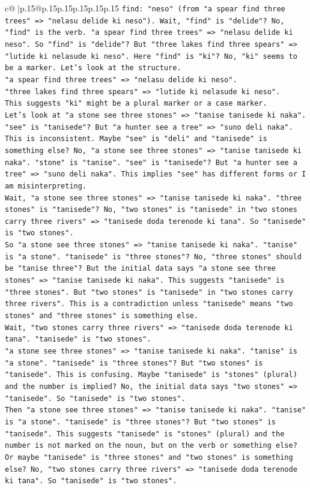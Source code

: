 \documentclass{article}
\begin{document}
{\begin{supertabular}{c@{$\;$}|p{.15\linewidth}@{}p{.15\linewidth}p{.15\linewidth}p{.15\linewidth}p{.15\linewidth}p{.15\linewidth}}
{{{\texttt{find: "neso" (from "a spear find three trees" => "nelasu delide ki neso"). Wait, "find" is "delide"? No, "find" is the verb. "a spear find three trees" => "nelasu delide ki neso". So "find" is "delide"? But "three lakes find three spears" => "lutide ki nelasude ki neso". Here "find" is "ki"? No, "ki" seems to be a marker. Let's look at the structure.} \\
\texttt{"a spear find three trees" => "nelasu delide ki neso".} \\
\texttt{"three lakes find three spears" => "lutide ki nelasude ki neso".} \\
\texttt{This suggests "ki" might be a plural marker or a case marker.} \\
\texttt{Let's look at "a stone see three stones" => "tanise tanisede ki naka". "see" is "tanisede"? But "a hunter see a tree" => "suno deli naka". This is inconsistent. Maybe "see" is "deli" and "tanisede" is something else? No, "a stone see three stones" => "tanise tanisede ki naka". "stone" is "tanise". "see" is "tanisede"? But "a hunter see a tree" => "suno deli naka". This implies "see" has different forms or I am misinterpreting.} \\
\texttt{Wait, "a stone see three stones" => "tanise tanisede ki naka". "three stones" is "tanisede"? No, "two stones" is "tanisede" in "two stones carry three rivers" => "tanisede doda terenode ki tana". So "tanisede" is "two stones".} \\
\texttt{So "a stone see three stones" => "tanise tanisede ki naka". "tanise" is "a stone". "tanisede" is "three stones"? No, "three stones" should be "tanise three"? But the initial data says "a stone see three stones" => "tanise tanisede ki naka". This suggests "tanisede" is "three stones". But "two stones" is "tanisede" in "two stones carry three rivers". This is a contradiction unless "tanisede" means "two stones" and "three stones" is something else.} \\
\texttt{Wait, "two stones carry three rivers" => "tanisede doda terenode ki tana". "tanisede" is "two stones".} \\
\texttt{"a stone see three stones" => "tanise tanisede ki naka". "tanise" is "a stone". "tanisede" is "three stones"? But "two stones" is "tanisede". This is confusing. Maybe "tanisede" is "stones" (plural) and the number is implied? No, the initial data says "two stones" => "tanisede". So "tanisede" is "two stones".} \\
\texttt{Then "a stone see three stones" => "tanise tanisede ki naka". "tanise" is "a stone". "tanisede" is "three stones"? But "two stones" is "tanisede". This suggests "tanisede" is "stones" (plural) and the number is not marked on the noun, but on the verb or something else? Or maybe "tanisede" is "three stones" and "two stones" is something else? No, "two stones carry three rivers" => "tanisede doda terenode ki tana". So "tanisede" is "two stones".} \\
}}}
\end{supertabular}}
\end{document}

